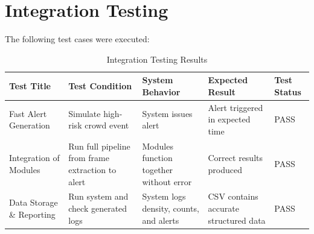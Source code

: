 \documentclass[11pt]{report}
\begin{document}
\section{Integration Testing}
The following test cases were executed:
\begin{table}[H]
    \centering
    \renewcommand{\arraystretch}{1.4}
    \setlength{\tabcolsep}{3pt}
    \footnotesize
    \begin{tabular}{| m{2.3cm} | m{3.2cm} | m{3.5cm} | m{3.2cm} | m{1.2cm} |}
        \hline
        \textbf{Test Title} & \textbf{Test Condition} & \textbf{System Behavior} & \textbf{Expected Result} & \textbf{Test Status} \\ 
        \hline
        Fast Alert Generation &	Simulate high-risk crowd event & System issues alert	& Alert triggered in expected time	& PASS \\
        \hline
        Integration of Modules &  Run full pipeline from frame extraction to alert	& Modules function together without error & Correct results produced & PASS \\
        \hline
        Data Storage \& Reporting &	Run system and check generated logs & System logs density, counts, and alerts	& CSV contains accurate structured data	& PASS \\
        \hline
    \end{tabular}
    \caption{Integration Testing Results}
\end{table}
\end{document}

